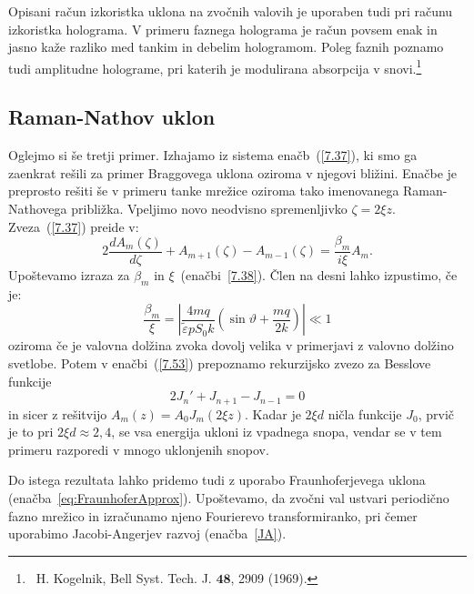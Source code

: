 \begin{remark}
Opisani račun izkoristka uklona na zvočnih valovih je uporaben tudi
pri računu izkoristka holograma. V primeru faznega holograma je račun
povsem enak in jasno kaže razliko med tankim in debelim hologramom.
Poleg faznih poznamo tudi amplitudne holograme, pri katerih je 
modulirana absorpcija v snovi.\footnote{~H.
Kogelnik, Bell Syst. Tech. J. $\mathbf{48}$, 2909 (1969).}
\end{remark}

\subsection*{Raman-Nathov uklon}
Oglejmo si še tretji primer. Izhajamo iz sistema enačb~(\ref{7.37}), ki smo ga 
zaenkrat rešili za primer Braggovega uklona oziroma v njegovi bližini. 
Enačbe je preprosto rešiti še v primeru tanke mrežice oziroma tako imenovanega 
Raman-Nathovega približka. 
Vpeljimo novo neodvisno spremenljivko $\zeta=2\xi z$. 
Zveza~(\ref{7.37})
preide v:
\begin{equation}
2\frac{dA_{m}(\zeta)}{d\zeta}+A_{m+1}(\zeta)-A_{m-1}(\zeta)=\frac{\beta_{m}}{i\xi}A_{m}.
\label{7.53}
\end{equation}
Upoštevamo izraza za $\beta_m$ in $\xi$~(enačbi~\ref{7.38}). 
Člen na desni lahko izpustimo, če je:
\begin{equation}
\frac{\beta_{m}}{\xi}=\left| \frac{4mq}{\tilde{\varepsilon}pS_0k}\left(\sin\vartheta+\frac{mq}{2k}\right)\right| 
\ll 1
\label{7.54}
\end{equation}
oziroma če je valovna dolžina zvoka dovolj velika v primerjavi z valovno dolžino svetlobe. Potem 
v enačbi~(\ref{7.53}) prepoznamo rekurzijsko zvezo za Besslove funkcije 
\begin{equation}
2J_{n}'+J_{n+1}-J_{n-1}=0
\label{7.55}
\end{equation}
in sicer z rešitvijo $A_{m}(z)=A_{0}J_{m}(2\xi z)$. Kadar je $2\xi d$ ničla funkcije
$J_{0}$, prvič je to pri $2\xi d\approx 2,4$, se vsa energija ukloni iz
vpadnega snopa, vendar se v tem primeru 
razporedi v mnogo uklonjenih snopov.
\begin{remark}
Do istega rezultata lahko pridemo tudi z uporabo Fraunhoferjevega uklona
(enačba~\ref{eq:FraunhoferApprox}). Upoštevamo, da zvočni val ustvari periodično fazno 
mrežico in izračunamo njeno Fourierevo transformiranko, pri čemer uporabimo 
Jacobi-Angerjev razvoj (enačba~\ref{JA}). 
\end{remark}

